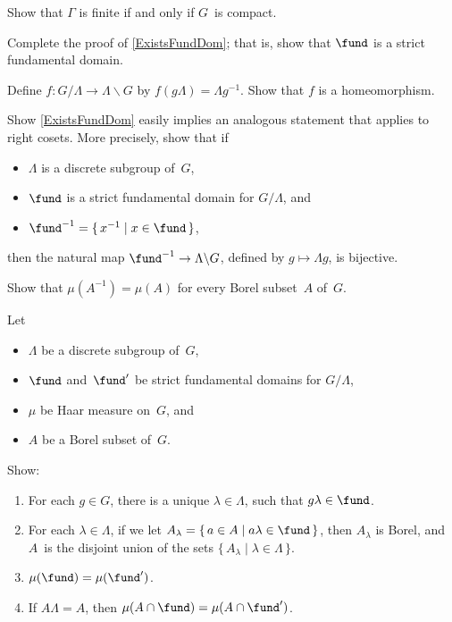 \begin{exercises}

\item Show that $\Gamma$ is finite if and only if $G$~is
compact.

\item \label{FisFundDom}
 Complete the proof of \cref{ExistsFundDom}; that
is, show that $\fund$ is a strict fundamental domain.

\item \label{LeftCosetsToRightCosets}
Define $f \colon G/\Lambda \to \Lambda \backslash G$ by $f(g \Lambda) = \Lambda g^{-1}$. Show that $f$ is a homeomorphism.

\item \label{FundDomRightCosets}
Show \cref{ExistsFundDom} easily implies an analogous statement that applies to right cosets. More precisely, show that if 
	\begin{itemize}
	\item $\Lambda$ is a discrete subgroup of~$G$, 
	\item $\fund$ is a strict fundamental domain for $G/\Lambda$, 
	and
	\item $\fund^{-1} = \{\, x^{-1} \mid x \in \fund \,\}$,
	\end{itemize}
then the natural map $\fund^{-1} \to \Lambda \backslash G$, defined
by $g \mapsto \Lambda g$, is bijective.

\item \label{mu(inverse)}
Show that $\mu(A^{-1}) = \mu(A)$ for every Borel subset~$A$ of~$G$.

\item \label{mu(fund)}
Let 
\noprelistbreak
	\begin{itemize}
	\item $\Lambda$ be a discrete subgroup of~$G$,
	\item $\fund$ and~$\fund'$ be strict fundamental domains for $G/\Lambda$,
	\item $\mu$ be Haar measure on~$G$,
	and
	\item $A$ be a Borel subset of~$G$.
	\end{itemize}
Show:
	 \begin{enumerate}
	 \item For each $g \in G$, there is a unique $\lambda \in \Lambda$, such that $g \lambda \in \fund$.
	 \item For each $\lambda \in \Lambda$, if we let
	 	 $A_\lambda = \{\, a \in A \mid a \lambda \in \fund \,\}$, then $A_\lambda$ is Borel, and $A$~is the disjoint union of the sets $\{\, A_\lambda \mid
	\lambda \in \Lambda \,\}$.
	 \item $\mu(\fund) = \mu(\fund')$.
	 \item \label{mu(fund)-F=F'}
	 If $A \Lambda = A$, then $\mu(A \cap \fund) = \mu(A \cap
	\fund')$.
	 \end{enumerate}


\end{exercises}
